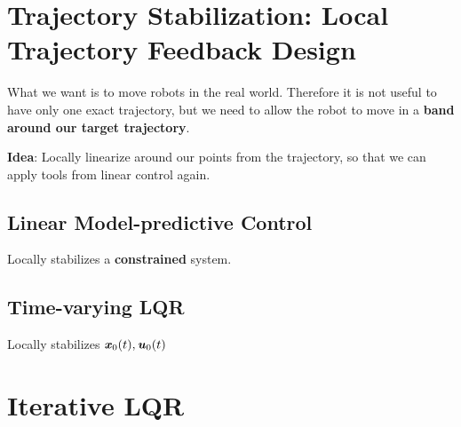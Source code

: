 \section{Trajectory Stabilization: Local Trajectory Feedback Design}
What we want is to move robots in the real world. Therefore it is not useful to have only one exact trajectory, but we need to allow the robot to move in a \textbf{band around our target trajectory}. 

\textbf{Idea}: Locally linearize around our points from the trajectory, so that we can apply tools from linear control again.

\subsection{Linear Model-predictive Control}
Locally stabilizes a \textbf{constrained} system.
\subsection{Time-varying LQR}
Locally stabilizes $\bm{\mathit{x}}_0(t), \bm{\mathit{u}}_0(t)$

\section{Iterative LQR}



  


